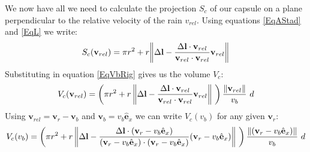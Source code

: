 \documentclass[a4paper,12pt]{article}
\begin{document}
%
We now have all we need to calculate the projection $S_c$ of our capsule on a plane perpendicular to the relative velocity of the rain $v_{rel}$. Using equations \ref{EqAStad} and \ref{EqL} we write:
%
\begin{equation}\label{EqSc}
S_c(\mathbf{v}_{rel}) = \pi r^2 + r \norm{\Delta \mathbf{l} -  \frac{\Delta \mathbf{l} \cdot \mathbf{v}_{rel}}{\mathbf{v}_{rel} \cdot \mathbf{v}_{rel}} \mathbf{v}_{rel}}
\end{equation} 
%
Substituting in equation \ref{EqVbRig} gives us the volume $V_c$:
%
\begin{equation}\label{EqVcVrel}
V_c(\mathbf{v}_{rel}) = \left( \pi r^2 + r \, \norm{\Delta \mathbf{l} -  \frac{\Delta \mathbf{l} \cdot \mathbf{v}_{rel}}{\mathbf{v}_{rel} \cdot \mathbf{v}_{rel}} \mathbf{v}_{rel}} \ \right) \frac{\norm{\mathbf{v}_{rel}}}{v_b} \ d
\end{equation} 
%
Using $\mathbf{v}_{rel} = \mathbf{v}_r - \mathbf{v}_b$ and $\mathbf{v}_b=v_b\hat{\mathbf{e}}_x$ we can write $V_c(v_b)$ for any given $\mathbf{v}_r$:
\begin{equation}\label{EqVcVb}
V_c(v_b) = \left( \pi r^2 + r \, \norm{\Delta \mathbf{l} -  \frac{\Delta \mathbf{l} \cdot (\mathbf{v}_r - v_b\hat{\mathbf{e}}_x)}{(\mathbf{v}_r - v_b\hat{\mathbf{e}}_x) \cdot (\mathbf{v}_r - v_b\hat{\mathbf{e}}_x)} (\mathbf{v}_r - v_b\hat{\mathbf{e}}_x)} \ \right) \frac{\norm{(\mathbf{v}_r - v_b\hat{\mathbf{e}}_x)}}{v_b} \ d
\end{equation} 
%
\end{document}
